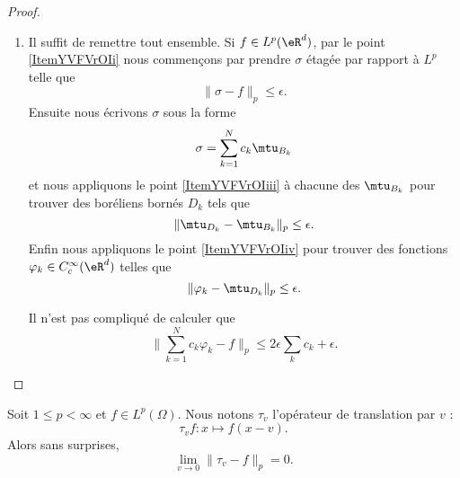 \begin{proof}
\begin{enumerate}
       \item

           Il suffit de remettre tout ensemble. Si \( f\in L^p(\eR^d)\), par le point \ref{ItemYVFVrOIi} nous commençons par prendre \( \sigma\) étagée par rapport à \( L^p\) telle que
           \begin{equation}
               \| \sigma-f \|_p\leq\epsilon.
           \end{equation}
           Ensuite nous écrivons \( \sigma\) sous la forme
           \begin{equation}
               \sigma=\sum_{k=1}^Nc_k\mtu_{B_k}
           \end{equation}
           et nous appliquons le point \ref{ItemYVFVrOIiii} à chacune des \( \mtu_{B_k}\) pour trouver des boréliens bornés \( D_k\) tels que
           \begin{equation}
               \| \mtu_{D_k}-\mtu_{B_k} \|_p\leq \epsilon.
           \end{equation}
           Enfin nous appliquons le point \ref{ItemYVFVrOIiv} pour trouver des fonctions \( \varphi_k\in C^{\infty}_c(\eR^d)\) telles que
           \begin{equation}
               \| \varphi_k-\mtu_{D_k} \|_p\leq \epsilon.
           \end{equation}
           
           Il n'est pas compliqué de calculer que
           \begin{equation}
               \big\| \sum_{k=1}^Nc_k\varphi_k-f \big\|_p\leq 2\epsilon\sum_kc_k+\epsilon.
           \end{equation}
        
   \end{enumerate}
\end{proof}

\begin{lemma}   \label{LemCUlJzkA}
    Soit \( 1\leq p<\infty\) et \( f\in L^p(\Omega)\). Nous notons \( \tau_v\) l'opérateur de translation par \( v\) :
    \begin{equation}
        \tau_vf\colon x\mapsto f(x-v).
    \end{equation}
    Alors sans surprises,
    \begin{equation}
        \lim_{v\to 0}\| \tau_v-f \|_p=0.
    \end{equation}
\end{lemma}

